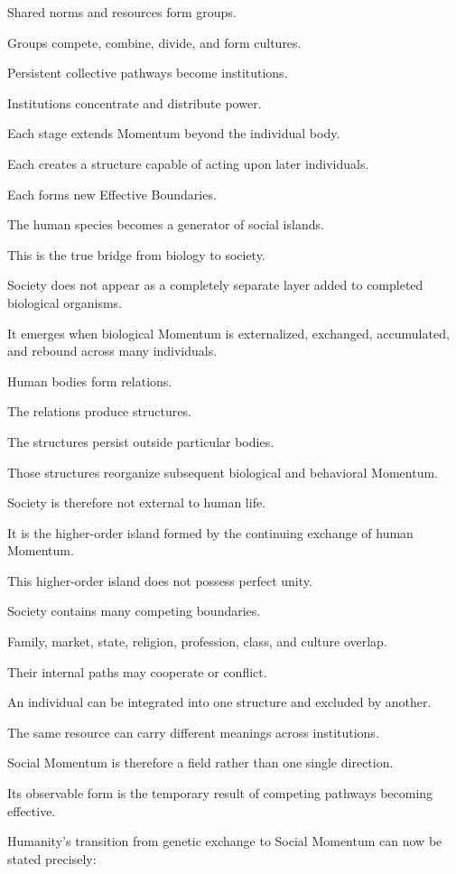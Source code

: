 Shared norms and resources form groups.

Groups compete, combine, divide, and form cultures.

Persistent collective pathways become institutions.

Institutions concentrate and distribute power.

Each stage extends Momentum beyond the individual body.

Each creates a structure capable of acting upon later individuals.

Each forms new Effective Boundaries.

The human species becomes a generator of social islands.

This is the true bridge from biology to society.

Society does not appear as a completely separate layer added to completed biological organisms.

It emerges when biological Momentum is externalized, exchanged, accumulated, and rebound across many individuals.

Human bodies form relations.

The relations produce structures.

The structures persist outside particular bodies.

Those structures reorganize subsequent biological and behavioral Momentum.

Society is therefore not external to human life.

It is the higher-order island formed by the continuing exchange of human Momentum.

This higher-order island does not possess perfect unity.

Society contains many competing boundaries.

Family, market, state, religion, profession, class, and culture overlap.

Their internal paths may cooperate or conflict.

An individual can be integrated into one structure and excluded by another.

The same resource can carry different meanings across institutions.

Social Momentum is therefore a field rather than one single direction.

Its observable form is the temporary result of competing pathways becoming effective.

Humanity’s transition from genetic exchange to Social Momentum can now be stated precisely:

